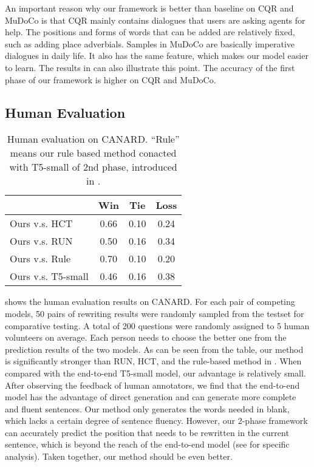 An important reason why our framework is better than baseline on CQR and MuDoCo is that CQR mainly contains dialogues that users are asking agents for help. The positions and forms of words that can be added are relatively fixed, such as adding place adverbials. Samples in MuDoCo are basically imperative dialogues in daily life. It also has the same feature, which makes our model easier to learn.
The results in  can also illustrate this point. The accuracy of the first phase of our framework is higher on CQR and MuDoCo.

\subsection{Human Evaluation}

\begin{table}[ht!]
\centering
\scriptsize
\begin{tabular}{lccc}
\toprule
 &    \textbf{Win} & \textbf{Tie} & \textbf{Loss} \\ \midrule
Ours v.s. HCT    & 0.66 & 0.10 & 0.24 \\
Ours v.s. RUN & 0.50 & 0.16 & 0.34 \\
Ours v.s. Rule  & 0.70 & 0.10 & 0.20 \\
Ours v.s. T5-small   & 0.46 & 0.16 & 0.38\\
\bottomrule
\end{tabular}
\caption{Human evaluation on CANARD. ``Rule'' means our rule based method conacted with T5-small of 2nd phase, introduced in .}
\label{tab:human-eval}
\end{table}

 shows the human evaluation results on CANARD. For each pair of competing models, 50 pairs of rewriting results were randomly sampled from the testset for comparative testing. A total of 200 questions were randomly assigned to 5 human volunteers on average. Each person needs to choose the better one from the prediction results of the two models. As can be seen from the table, our method is significantly stronger than RUN, HCT, and the rule-based method in . When compared with the end-to-end T5-small model, our advantage is relatively small. After observing the feedback of human annotators, we find that the end-to-end model has the advantage of direct generation and can generate more complete and fluent sentences. Our method only generates the words needed in blank, which lacks a certain degree of sentence fluency. However, our 2-phase framework can accurately predict the position that needs to be rewritten in the current sentence, which is beyond the reach of the end-to-end model (see  for specific analysis).
 Taken together, our method should be even better.

